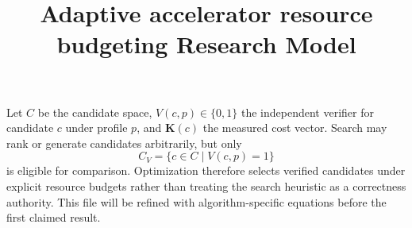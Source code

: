 \documentclass{article}
\title{Adaptive accelerator resource budgeting Research Model}
\begin{document}
\maketitle
Let $C$ be the candidate space, $V(c,p)\in\{0,1\}$ the independent verifier
for candidate $c$ under profile $p$, and $\mathbf{K}(c)$ the measured cost
vector. Search may rank or generate candidates arbitrarily, but only
\[
  C_V = \{c\in C\mid V(c,p)=1\}
\]
is eligible for comparison. Optimization therefore selects verified candidates
under explicit resource budgets rather than treating the search heuristic as a
correctness authority. This file will be refined with algorithm-specific
equations before the first claimed result.
\end{document}
